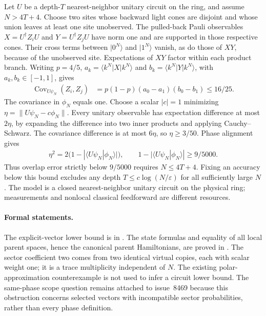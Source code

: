 \documentclass{article}
\begin{document}
Let $U$ be a depth-$T$ nearest-neighbor unitary circuit on the ring, and
assume $N>4T+4$. Choose two sites whose backward light cones are disjoint
and whose union leaves at least one site unobserved. The pulled-back Pauli
observables $X=U^\dagger Z_iU$ and $Y=U^\dagger Z_jU$ have norm one and
are supported in those respective cones. Their cross terms between
$|0^N\rangle$ and $|1^N\rangle$ vanish, as do those of $XY$, because of
the unobserved site. Expectations of $XY$ factor within each product
branch. Writing $p=4/5$, $a_k=\langle k^N|X|k^N\rangle$ and
$b_k=\langle k^N|Y|k^N\rangle$, with $a_k,b_k\in[-1,1]$, gives
\begin{align}
    \operatorname{Cov}_{U\psi_N}(Z_i,Z_j)
     & =p(1-p)(a_0-a_1)(b_0-b_1)\leq 16/25.
\end{align}
The covariance in $\phi_N$ equals one. Choose a scalar $|c|=1$ minimizing
$\eta=\|U\psi_N-c\phi_N\|$. Every unitary observable has expectation
difference at most $2\eta$, by expanding the difference into two inner
products and applying Cauchy--Schwarz. The covariance difference is at
most $6\eta$, so $\eta\geq3/50$. Phase alignment gives
\begin{align}
    \eta^2=2(1-|\langle U\psi_N|\phi_N\rangle|),\qquad
    1-|\langle U\psi_N|\phi_N\rangle|\geq9/5000.
\end{align}
Thus overlap error strictly below $9/5000$ requires $N\leq4T+4$.
Fixing an accuracy below this bound excludes any depth
$T\leq c\log(N/\varepsilon)$ for all sufficiently large $N$.
The model is a closed nearest-neighbor unitary circuit on the physical ring;
measurements and nonlocal classical feedforward are different resources.

\paragraph{Formal statements.}
The explicit-vector lower bound is
 in
. The state formulas
and equality of all local parent spaces, hence the canonical parent
Hamiltonians, are proved in
.
The sector coefficient two comes from two identical virtual copies, each
with scalar weight one; it is a trace multiplicity independent of $N$.
The existing polar-approximation counterexample is not used to infer a
circuit lower bound. The same-phase scope question remains attached to
issue~8469 because this obstruction concerns selected vectors with
incompatible sector probabilities, rather than every phase definition.
\end{document}
